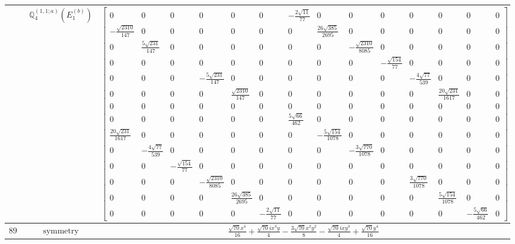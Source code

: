 \documentclass[fleqn,8pt,landscape]{jsarticle}
\begin{document}
\begin{longtable}{ccc}
$  $ & $ \mathbb{Q}_{4}^{(1,1;a)}(E_{1}^{(b)}) $ & $ \begin{bmatrix} 0 & 0 & 0 & 0 & 0 & 0 & - \frac{2 \sqrt{11}}{77} & 0 & 0 & 0 & 0 & 0 & 0 & 0 \\ - \frac{\sqrt{2310}}{147} & 0 & 0 & 0 & 0 & 0 & 0 & \frac{26 \sqrt{385}}{2695} & 0 & 0 & 0 & 0 & 0 & 0 \\ 0 & \frac{5 \sqrt{231}}{147} & 0 & 0 & 0 & 0 & 0 & 0 & - \frac{\sqrt{2310}}{8085} & 0 & 0 & 0 & 0 & 0 \\ 0 & 0 & 0 & 0 & 0 & 0 & 0 & 0 & 0 & - \frac{\sqrt{154}}{77} & 0 & 0 & 0 & 0 \\ 0 & 0 & 0 & - \frac{5 \sqrt{231}}{147} & 0 & 0 & 0 & 0 & 0 & 0 & - \frac{4 \sqrt{77}}{539} & 0 & 0 & 0 \\ 0 & 0 & 0 & 0 & \frac{\sqrt{2310}}{147} & 0 & 0 & 0 & 0 & 0 & 0 & \frac{20 \sqrt{231}}{1617} & 0 & 0 \\ 0 & 0 & 0 & 0 & 0 & 0 & 0 & 0 & 0 & 0 & 0 & 0 & 0 & 0 \\ 0 & 0 & 0 & 0 & 0 & 0 & \frac{5 \sqrt{66}}{462} & 0 & 0 & 0 & 0 & 0 & 0 & 0 \\ \frac{20 \sqrt{231}}{1617} & 0 & 0 & 0 & 0 & 0 & 0 & - \frac{5 \sqrt{154}}{1078} & 0 & 0 & 0 & 0 & 0 & 0 \\ 0 & - \frac{4 \sqrt{77}}{539} & 0 & 0 & 0 & 0 & 0 & 0 & - \frac{3 \sqrt{770}}{1078} & 0 & 0 & 0 & 0 & 0 \\ 0 & 0 & - \frac{\sqrt{154}}{77} & 0 & 0 & 0 & 0 & 0 & 0 & 0 & 0 & 0 & 0 & 0 \\ 0 & 0 & 0 & - \frac{\sqrt{2310}}{8085} & 0 & 0 & 0 & 0 & 0 & 0 & \frac{3 \sqrt{770}}{1078} & 0 & 0 & 0 \\ 0 & 0 & 0 & 0 & \frac{26 \sqrt{385}}{2695} & 0 & 0 & 0 & 0 & 0 & 0 & \frac{5 \sqrt{154}}{1078} & 0 & 0 \\ 0 & 0 & 0 & 0 & 0 & - \frac{2 \sqrt{11}}{77} & 0 & 0 & 0 & 0 & 0 & 0 & - \frac{5 \sqrt{66}}{462} & 0 \end{bmatrix} $ \\ \hline
$ 895 $ & $ \text{symmetry} $ & $ \frac{\sqrt{70} x^{4}}{16} + \frac{\sqrt{70} i x^{3} y}{4} - \frac{3 \sqrt{70} x^{2} y^{2}}{8} - \frac{\sqrt{70} i x y^{3}}{4} + \frac{\sqrt{70} y^{4}}{16} $ \\

\end{longtable}
\end{document}
